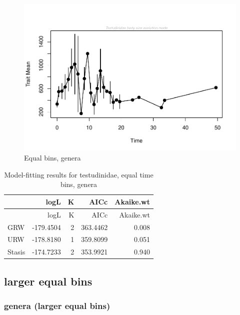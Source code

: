 \documentclass[]{article}
\begin{document}
\begin{figure}[htbp]
\centering
\includegraphics{MA_JJ_files/figure-latex/Play around with time bins, generic level-1.pdf}
\caption{Equal bins, genera}
\end{figure}

\begin{longtable}[]{@{}lrrrr@{}}
\caption{Model-fitting results for testudinidae, equal time bins,
genera}\tabularnewline
\toprule
& logL & K & AICc & Akaike.wt\tabularnewline
\midrule
\endfirsthead
\toprule
& logL & K & AICc & Akaike.wt\tabularnewline
\midrule
\endhead
GRW & -179.4504 & 2 & 363.4462 & 0.008\tabularnewline
URW & -178.8180 & 1 & 359.8099 & 0.051\tabularnewline
Stasis & -174.7233 & 2 & 353.9921 & 0.940\tabularnewline
\bottomrule
\end{longtable}

\subsection{larger equal bins}\label{larger-equal-bins}

\subsubsection{genera (larger equal
bins)}\label{genera-larger-equal-bins}
\end{document}
